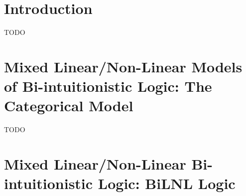 \documentclass{lmcs}
\begin{document}
\section{Introduction}
\label{sec:introduction}
TODO \cite{?}

\section{Mixed Linear/Non-Linear Models of Bi-intuitionistic Logic: The Categorical Model}
\label{sec:the_categorical_model}
TODO

\section{Mixed Linear/Non-Linear Bi-intuitionistic Logic: BiLNL Logic}
\label{sec:bilnl_logic}
\end{document}
